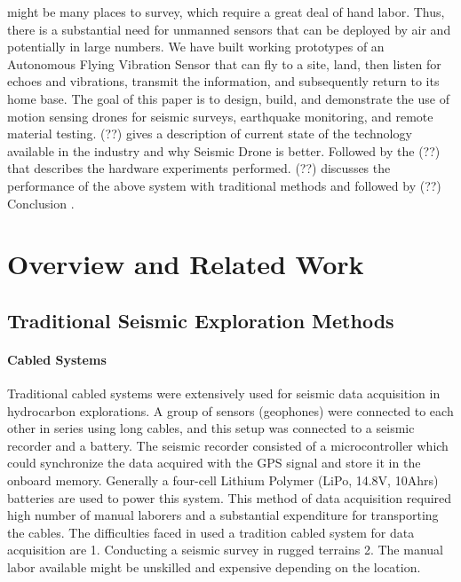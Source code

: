 \documentclass[conference]{IEEEtran}
\newcommand{\todo}[1]{\vspace{5 mm}\par \noindent \framebox{\begin{minipage}[c]{0.98 \columnwidth} \ttfamily\flushleft \textcolor{red}{#1}\end{minipage}}\vspace{5 mm}\par}
\begin{document}
might be many places to survey, which require a great deal
of hand labor. Thus, there is a substantial need for unmanned
sensors that can be deployed by air and potentially in large
numbers. We have built working prototypes of an Autonomous
Flying Vibration Sensor that can fly to a site, land, then
listen for echoes and vibrations, transmit the information, and
subsequently return to its home base.
The goal of this paper is to design, build, and demonstrate
the use of motion sensing drones for seismic surveys, earthquake monitoring, and remote material testing. (??) gives a
description of current state of the technology available in the
industry and why Seismic Drone is better. Followed by the
(??) that describes the hardware experiments performed. (??)
discusses the performance of the above system with traditional methods and followed by (??) Conclusion .

\section{Overview and Related Work}\label{sec:RelatedWork}


\subsection{Traditional Seismic Exploration Methods}

\todo{cite the book that Li sent us.  Also cite some papers by Rob.}

\todo{ an equation describing seismic waves in earth }


 \paragraph{Cabled Systems}

 Traditional cabled systems were extensively used for seismic data acquisition in hydrocarbon explorations. A group of sensors (geophones) were connected to each other in series using long cables, and this setup was connected to a seismic recorder and a battery. The seismic recorder consisted of a microcontroller which could synchronize the data acquired with the GPS signal and store it in the onboard memory. Generally a four-cell Lithium Polymer (LiPo, 14.8V, 10Ahrs) batteries are used to power this system. This method of data acquisition required high number of manual laborers and a substantial expenditure for transporting the cables. The difficulties faced in used a tradition cabled system for data acquisition are 1. Conducting a seismic survey in rugged terrains 2. The manual labor available might be unskilled and expensive depending on the location.  
 
\end{document}
